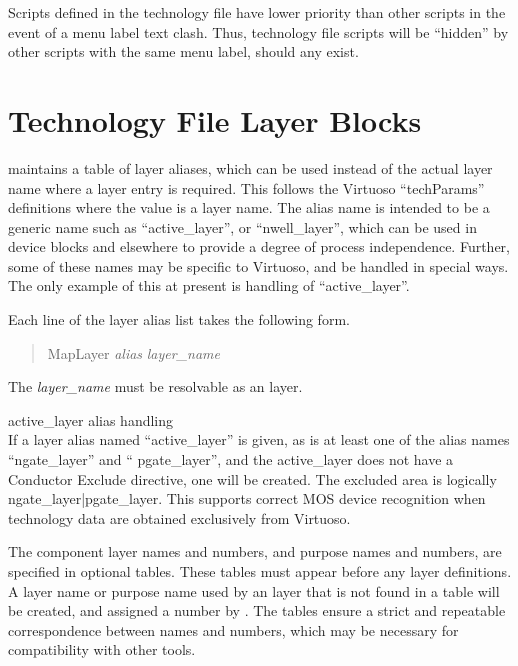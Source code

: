Scripts defined in the technology file have lower priority than other
scripts in the event of a menu label text clash.  Thus, technology
file scripts will be ``hidden'' by other scripts with the same menu
label, should any exist.


\section{Technology File Layer Blocks}
\label{techlayers}

{\Xic} maintains a table of layer aliases, which can be used instead
of the actual layer name where a layer entry is required.  This
follows the Virtuoso ``{\vt techParams}'' definitions where the value
is a layer name.  The alias name is intended to be a generic name such
as ``{\vt active\_layer}'', or ``{\vt nwell\_layer}'', which can be
used in device blocks and elsewhere to provide a degree of process
independence.  Further, some of these names may be specific to
Virtuoso, and be handled in special ways.  The only example of this at
present is handling of ``{\vt active\_layer}''.

Each line of the layer alias list takes the following form.
\begin{quote}
{\vt MapLayer} {\it alias} {\it layer\_name}
\end{quote}
The {\it layer\_name} must be resolvable as an {\Xic} layer.

\begin{description}
\item{\vt active\_layer} alias handling\\
If a layer alias named ``{\vt active\_layer}'' is given, as is at
least one of the alias names ``{\vt ngate\_layer}'' and ``{\vt
pgate\_layer}'', and the {\vt active\_layer} does not have a {\vt
Conductor Exclude} directive, one will be created.  The excluded area
is logically {\vt ngate\_layer|pgate\_layer}.  This supports correct
MOS device recognition when technology data are obtained exclusively
from Virtuoso.
\end{description}

The component layer names and numbers, and purpose names and numbers,
are specified in optional tables.  These tables must appear before any
{\Xic} layer definitions.  A layer name or purpose name used by an
{\Xic} layer that is not found in a table will be created, and
assigned a number by {\Xic}.  The tables ensure a strict and
repeatable correspondence between names and numbers, which may be
necessary for compatibility with other tools.

